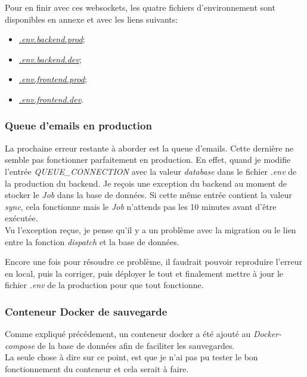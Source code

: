 \documentclass[
    iai, %
    il, %
]{heig-tb}
\begin{document}
Pour en finir avec ces \Gls{websockets}, les quatre fichiers d'environnement sont disponibles en annexe et avec les liens suivants:
\begin{itemize}
    \item \href{https://github.com/heig-fablab/fablab-manager/blob/main/.env.prod.example}{\emph{.env.backend.prod}};
    \item \href{https://github.com/heig-fablab/fablab-manager/blob/main/.env.dev.example}{\emph{.env.backend.dev}};
    \item \href{https://github.com/heig-fablab/fablab-manager-frontend/blob/main/.env.prod.example}{\emph{.env.frontend.prod}};
    \item \href{https://github.com/heig-fablab/fablab-manager-frontend/blob/main/.env.dev.example}{\emph{.env.frontend.dev}}.
\end{itemize}

\subsubsection{Queue d'emails en production}
La prochaine erreur restante à aborder est la queue d'emails.
Cette dernière ne semble pas fonctionner parfaitement en production.
En effet, quand je modifie l'entrée \emph{QUEUE\_CONNECTION} avec la valeur \emph{database} dans le fichier \emph{.env} de la production du \Gls{backend}.
Je reçois une exception du \Gls{backend} au moment de stocker le \emph{Job} dans la base de données.
Si cette même entrée contient la valeur \emph{sync}, cela fonctionne mais le \emph{Job} n'attends pas les 10 minutes avant d'être exécutée. \\
Vu l'exception reçue, je pense qu'il y a un problème avec la migration ou le lien entre la fonction \emph{dispatch} et la base de données.

Encore une fois pour résoudre ce problème, il faudrait pouvoir reproduire l'erreur en local, puis la corriger, puis déployer le tout et finalement mettre à jour le fichier \emph{.env} de la production pour que tout fonctionne.

\subsubsection{Conteneur Docker de sauvegarde}
Comme expliqué précédement, un \Gls{conteneur} \Gls{docker} a été ajouté au \emph{Docker-compose} de la base de données afin de faciliter les sauvegardes.\\
La seule chose à dire sur ce point, est que je n'ai pas pu tester le bon fonctionnement du \Gls{conteneur} et cela serait à faire.
\end{document}

